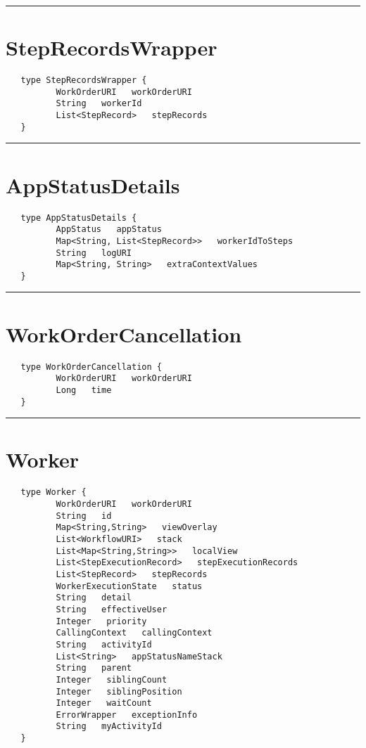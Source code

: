\rule{12cm}{2pt}
\section{StepRecordsWrapper}
\label{type:StepRecordsWrapper}

\begin{Verbatim}
   type StepRecordsWrapper {
          WorkOrderURI   workOrderURI
          String   workerId
          List<StepRecord>   stepRecords
   }
\end{Verbatim}

\rule{12cm}{2pt}
\section{AppStatusDetails}
\label{type:AppStatusDetails}

\begin{Verbatim}
   type AppStatusDetails {
          AppStatus   appStatus
          Map<String, List<StepRecord>>   workerIdToSteps
          String   logURI
          Map<String, String>   extraContextValues
   }
\end{Verbatim}

\rule{12cm}{2pt}
\section{WorkOrderCancellation}
\label{type:WorkOrderCancellation}

\begin{Verbatim}
   type WorkOrderCancellation {
          WorkOrderURI   workOrderURI
          Long   time
   }
\end{Verbatim}

\rule{12cm}{2pt}
\section{Worker}
\label{type:Worker}

\begin{Verbatim}
   type Worker {
          WorkOrderURI   workOrderURI
          String   id
          Map<String,String>   viewOverlay
          List<WorkflowURI>   stack
          List<Map<String,String>>   localView
          List<StepExecutionRecord>   stepExecutionRecords
          List<StepRecord>   stepRecords
          WorkerExecutionState   status
          String   detail
          String   effectiveUser
          Integer   priority
          CallingContext   callingContext
          String   activityId
          List<String>   appStatusNameStack
          String   parent
          Integer   siblingCount
          Integer   siblingPosition
          Integer   waitCount
          ErrorWrapper   exceptionInfo
          String   myActivityId
   }
\end{Verbatim}

